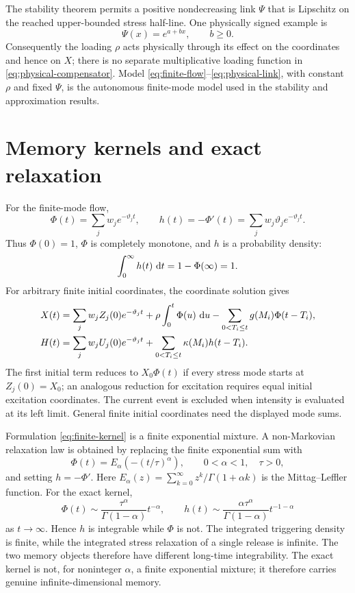 The stability theorem permits a positive nondecreasing link $\Psi$ that is Lipschitz on the reached upper-bounded stress half-line. One physically signed example is
\begin{equation}\label{eq:physical-link}
\Psi(x)=e^{a+bx},\qquad b\geq0.
\end{equation}
Consequently the loading \(\rho\) acts physically through its effect on the coordinates and hence on \(X\); there is no separate multiplicative loading function in \eqref{eq:physical-compensator}. Model \eqref{eq:finite-flow}--\eqref{eq:physical-link}, with constant \(\rho\) and fixed \(\Psi\), is the autonomous finite-mode model used in the stability and approximation results.

\section{Memory kernels and exact relaxation}

For the finite-mode flow,
\begin{equation}\label{eq:finite-kernel}
\Phi(t)=\sum_jw_je^{-\vartheta_jt},\qquad
h(t)=-\Phi'(t)=\sum_jw_j\vartheta_je^{-\vartheta_jt}.
\end{equation}
Thus \(\Phi(0)=1\), \(\Phi\) is completely monotone, and \(h\) is a probability density:
\[
\int_0^\infty h(t)\,\mathop{}\!\mathrm{d} t=1-\Phi(\infty)=1.
\]
For arbitrary finite initial coordinates, the coordinate solution gives
\begin{align}
X(t)&=\sum_jw_jZ_j(0)e^{-\vartheta_jt}+\rho\int_0^t\Phi(u)\,\mathop{}\!\mathrm{d} u
-\sum_{0<T_i\leq t}g(M_i)\Phi(t-T_i),\label{eq:finite-X-mild}\\
H(t)&=\sum_jw_jU_j(0)e^{-\vartheta_jt}
+\sum_{0<T_i\leq t}\kappa(M_i)h(t-T_i).\label{eq:finite-H-mild}
\end{align}
The first initial term reduces to \(X_0\Phi(t)\) if every stress mode starts at \(Z_j(0)=X_0\); an analogous reduction for excitation requires equal initial excitation coordinates. The current event is excluded when intensity is evaluated at its left limit. General finite initial coordinates need the displayed mode sums.

Formulation \eqref{eq:finite-kernel} is a finite exponential mixture. A non-Markovian relaxation law is obtained by replacing the finite exponential sum with
\begin{equation}\label{eq:mittag-leffler}
\Phi(t)=E_\alpha\!\left(-(t/\tau)^\alpha\right),
\qquad 0<\alpha<1,\quad \tau>0,
\end{equation}
and setting \(h=-\Phi'\). Here \(E_\alpha(z)=\sum_{k=0}^{\infty}z^k/\Gamma(1+\alpha k)\) is the Mittag--Leffler function. For the exact kernel,
\[
\Phi(t)\sim \frac{\tau^\alpha}{\Gamma(1-\alpha)}t^{-\alpha},
\qquad
h(t)\sim \frac{\alpha\tau^\alpha}{\Gamma(1-\alpha)}t^{-1-\alpha}
\]
as \(t\to\infty\). Hence \(h\) is integrable while \(\Phi\) is not. The integrated triggering density is finite, while the integrated stress relaxation of a single release is infinite. The two memory objects therefore have different long-time integrability. The exact kernel is not, for noninteger \(\alpha\), a finite exponential mixture; it therefore carries genuine infinite-dimensional memory.


